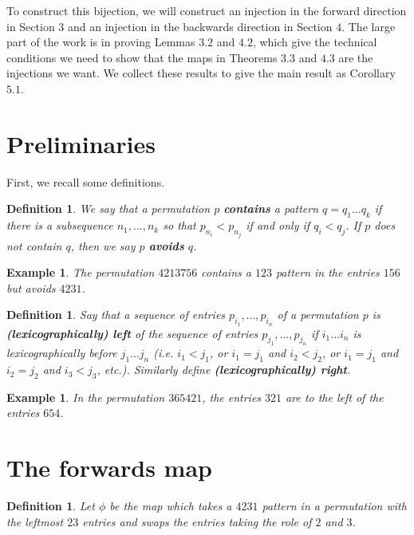 \documentclass[11pt]{amsart}
\newtheorem{definition}[theorem]{Definition}
\newtheorem{example}[theorem]{Example}
\theoremstyle{remark}
\numberwithin{equation}{section}
\begin{document}
To construct this bijection, we will construct an injection in the forward direction in Section 3 and an injection in the backwards direction in Section $4$. The large part of the work is in proving Lemmas $3.2$ and $4.2$, which give the technical conditions we need to show that the maps in Theorems $3.3$ and $4.3$ are the injections we want. We collect these results to give the main result as Corollary $5.1$.



\section{Preliminaries}

First, we recall some definitions.

\begin{definition}
    We say that a permutation $p$ \textbf{contains} a pattern $q = q_1 ... q_k$ if there is a subsequence $n_1, ..., n_k$ so that $p_{n_i} < p_{n_j}$ if and only if $q_i < q_j$. If $p$ does not contain $q$, then we say $p$ \textbf{avoids} $q$.
\end{definition}

\begin{example}
    The permutation $4213756$ contains a $123$ pattern in the entries $156$ but avoids $4231$.
\end{example}

\begin{definition}
    Say that a sequence of entries $p_{i_1}, ..., p_{i_n}$ of a permutation $p$ is \textbf{(lexicographically) left} of the sequence of entries $p_{j_1}, ..., p_{j_n}$ if $i_1...i_n$ is lexicographically before $j_1...j_n$ (i.e. $i_1< j_1$, or $i_1=j_1$ and $i_2 < j_2$, or $i_1 = j_1$ and $i_2=j_2$ and $i_3<j_3$, etc.). Similarly define \textbf{(lexicographically) right}.
\end{definition}

\begin{example}
    In the permutation $365421$, the entries $321$ are to the left of the entries $654$.
\end{example}

\section{The forwards map}

\begin{definition}
    Let $\phi$ be the map which takes a $4231$ pattern in a permutation with the leftmost $23$ entries and swaps the entries taking the role of $2$ and $3$.
\end{definition}
\end{document}
